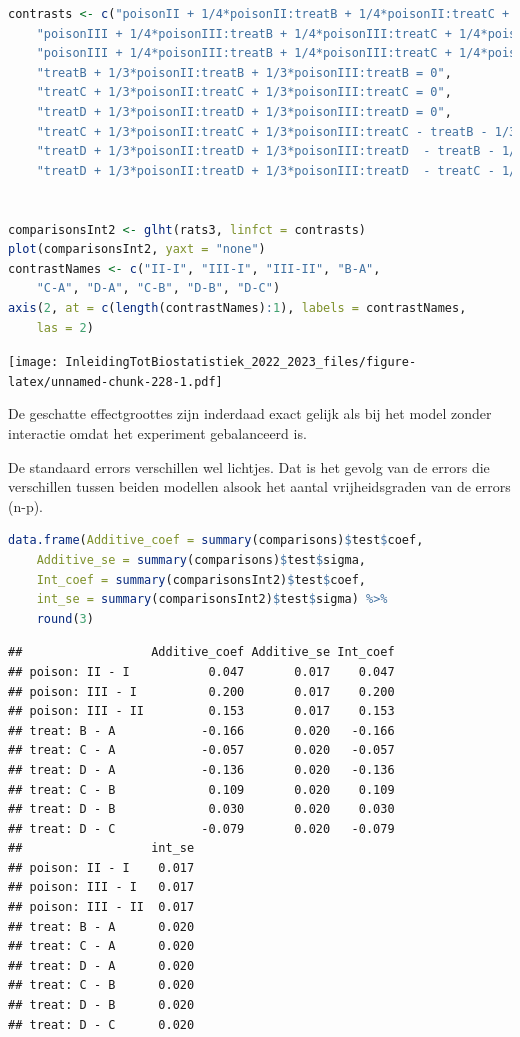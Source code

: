 \documentclass[
  12pt,dutch,coursenotes]{book}
\begin{document}
\begin{lstlisting}[language=R]
contrasts <- c("poisonII + 1/4*poisonII:treatB + 1/4*poisonII:treatC + 1/4*poisonII:treatD = 0",
    "poisonIII + 1/4*poisonIII:treatB + 1/4*poisonIII:treatC + 1/4*poisonIII:treatD= 0",
    "poisonIII + 1/4*poisonIII:treatB + 1/4*poisonIII:treatC + 1/4*poisonIII:treatD - poisonII - 1/4*poisonII:treatB - 1/4*poisonII:treatC - 1/4*poisonII:treatD = 0",
    "treatB + 1/3*poisonII:treatB + 1/3*poisonIII:treatB = 0",
    "treatC + 1/3*poisonII:treatC + 1/3*poisonIII:treatC = 0",
    "treatD + 1/3*poisonII:treatD + 1/3*poisonIII:treatD = 0",
    "treatC + 1/3*poisonII:treatC + 1/3*poisonIII:treatC - treatB - 1/3*poisonII:treatB - 1/3*poisonIII:treatB = 0",
    "treatD + 1/3*poisonII:treatD + 1/3*poisonIII:treatD  - treatB - 1/3*poisonII:treatB - 1/3*poisonIII:treatB = 0",
    "treatD + 1/3*poisonII:treatD + 1/3*poisonIII:treatD  - treatC - 1/3*poisonII:treatC - 1/3*poisonIII:treatC = 0")


comparisonsInt2 <- glht(rats3, linfct = contrasts)
plot(comparisonsInt2, yaxt = "none")
contrastNames <- c("II-I", "III-I", "III-II", "B-A",
    "C-A", "D-A", "C-B", "D-B", "D-C")
axis(2, at = c(length(contrastNames):1), labels = contrastNames,
    las = 2)
\end{lstlisting}

\texttt{[image: InleidingTotBiostatistiek\_2022\_2023\_files/figure-latex/unnamed-chunk-228-1.pdf]}

De geschatte effectgroottes zijn inderdaad exact gelijk als bij het model zonder interactie omdat het experiment gebalanceerd is.

De standaard errors verschillen wel lichtjes.
Dat is het gevolg van de errors die verschillen tussen beiden modellen alsook het aantal vrijheidsgraden van de errors (n-p).

\begin{lstlisting}[language=R]
data.frame(Additive_coef = summary(comparisons)$test$coef,
    Additive_se = summary(comparisons)$test$sigma,
    Int_coef = summary(comparisonsInt2)$test$coef,
    int_se = summary(comparisonsInt2)$test$sigma) %>%
    round(3)
\end{lstlisting}

\begin{lstlisting}
##                  Additive_coef Additive_se Int_coef
## poison: II - I           0.047       0.017    0.047
## poison: III - I          0.200       0.017    0.200
## poison: III - II         0.153       0.017    0.153
## treat: B - A            -0.166       0.020   -0.166
## treat: C - A            -0.057       0.020   -0.057
## treat: D - A            -0.136       0.020   -0.136
## treat: C - B             0.109       0.020    0.109
## treat: D - B             0.030       0.020    0.030
## treat: D - C            -0.079       0.020   -0.079
##                  int_se
## poison: II - I    0.017
## poison: III - I   0.017
## poison: III - II  0.017
## treat: B - A      0.020
## treat: C - A      0.020
## treat: D - A      0.020
## treat: C - B      0.020
## treat: D - B      0.020
## treat: D - C      0.020
\end{lstlisting}
\end{document}
